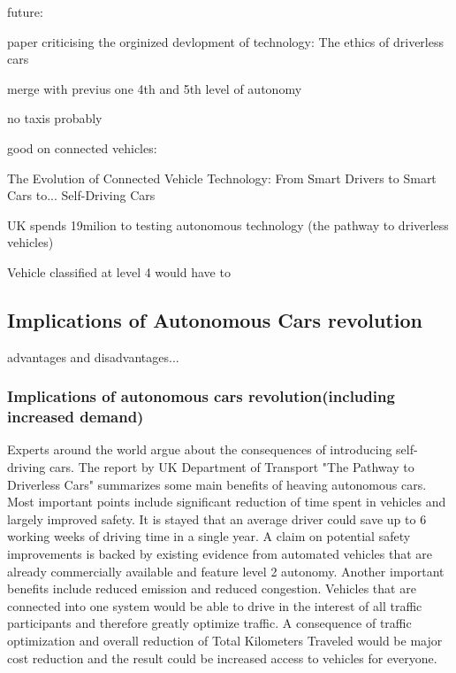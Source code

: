 \documentclass[11pt,english]{article}
\begin{document}
\citep{kitti2012we}

future:


paper criticising the orginized devlopment of technology:
The ethics of driverless cars

merge with previus one
4th and 5th level of autonomy


no taxis probably

good on connected vehicles:

The Evolution of Connected Vehicle Technology: From Smart Drivers to Smart Cars to... Self-Driving Cars

UK spends 19milion to testing autonomous technology (the pathway to driverless vehicles)

Vehicle classified at level 4 would have to 


\subsection{Implications of Autonomous Cars revolution}

advantages and disadvantages...

\subsubsection{Implications of autonomous cars revolution(including increased demand)}

Experts around the world argue about the consequences of introducing self-driving cars. The report by UK Department of Transport "The Pathway to Driverless Cars" summarizes some main benefits of heaving autonomous cars. Most important points include significant reduction of time spent in vehicles and largely improved safety. It is stayed that an average driver could save up to 6 working weeks of driving time in a single year. A claim on potential safety improvements is backed by existing evidence from automated vehicles that are already commercially available and feature level 2 autonomy. Another important benefits include reduced emission and reduced congestion. Vehicles that are connected into one system would be able to drive in the interest of all traffic participants and therefore greatly optimize traffic. 
A consequence of traffic optimization and overall reduction of Total Kilometers Traveled would be major cost reduction and the result could be increased access to vehicles for everyone\citep{pathwaytodriverless}.
\end{document}
